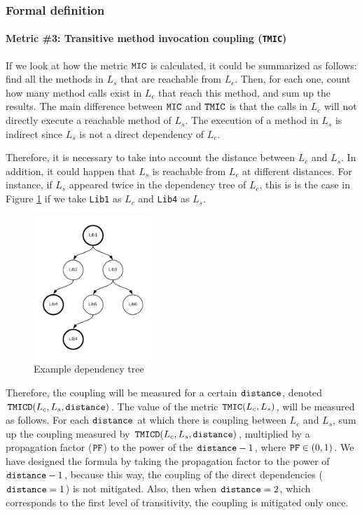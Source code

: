 \subsubsection{Formal definition}

\paragraph{Metric \#3: Transitive method invocation coupling (\texttt{TMIC})}
If we look at how the metric $\verb|MIC|$ is calculated, it could be summarized as follows: find all the methods in $L_s$ that are reachable from $L_c$. Then, for each one, count how many method calls exist in $L_c$ that reach this method, and sum up the results. The main difference between $\verb|MIC|$ and $\verb|TMIC|$ is that the calls in $L_c$ will not directly execute a reachable method of $L_s$. The execution of a method in $L_s$ is indirect since $L_s$ is not a direct dependency of $L_c$.

Therefore, it is necessary to take into account the distance between $L_c$ and $L_s$. In addition, it could happen that $L_s$ is reachable from $L_c$ at different distances. For instance, if $L_s$ appeared twice in the dependency tree of $L_c$, this is is the case in Figure \ref{fig:dependency-tree} if we take \texttt{Lib1} as $L_c$ and \texttt{Lib4} as $L_s$.

\begin{figure}[ht]
\begin{center}
\includegraphics[width=0.4\textwidth]{figures/Thesis-DependencyTree.png}
\caption{Example dependency tree}
\label{fig:dependency-tree}
\end{center}
\end{figure}

Therefore, the coupling will be measured for a certain $\verb|distance|$, denoted $\verb|TMICD|(L_c,L_s, \verb|distance|)$.
The value of the metric $\verb|TMIC|(L_c,L_s)$, will be measured as follows. For each $\verb|distance|$ at which there is coupling between $L_c$ and $L_s$, sum up the coupling measured by $\verb|TMICD|(L_c,L_s, \verb|distance|)$, multiplied by a propagation factor ($\verb|PF|$) to the power of the $\verb|distance| - 1$, where $\verb|PF| \in (0,1)$. We have designed the formula by taking the propagation factor to the power of $\verb|distance| - 1$, because this way, the coupling of the direct dependencies ($\verb|distance| = 1$) is not mitigated. Also, then when $\verb|distance| = 2$, which corresponds to the first level of transitivity, the coupling is mitigated only once.

